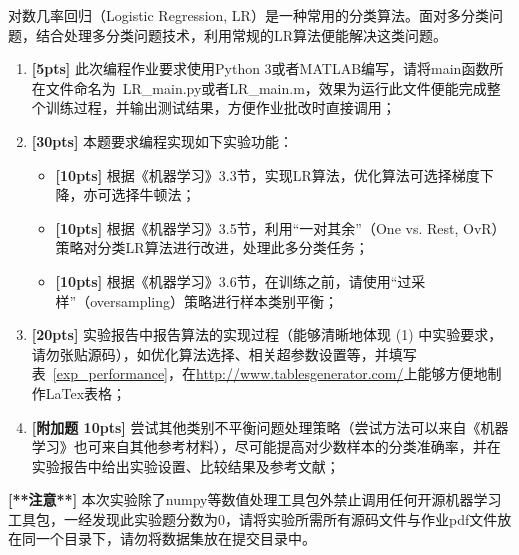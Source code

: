 \documentclass[a4paper,UTF8]{article}
\numberwithin{equation}{section}
\begin{document}
对数几率回归（Logistic Regression, LR）是一种常用的分类算法。面对多分类问题，结合处理多分类问题技术，利用常规的LR算法便能解决这类问题。

\begin{enumerate}[(1)]
    \item \textbf{[5pts]} 此次编程作业要求使用Python 3或者MATLAB编写，请将main函数所在文件命名为~LR\_main.py或者LR\_main.m，效果为运行此文件便能完成整个训练过程，并输出测试结果，方便作业批改时直接调用；	
	\item \textbf{[30pts]} 本题要求编程实现如下实验功能：
	\begin{itemize}
		\item \textbf{[10pts]} 根据《机器学习》3.3节，实现LR算法，优化算法可选择梯度下降，亦可选择牛顿法；
		\item \textbf{[10pts]} 根据《机器学习》3.5节，利用“一对其余”（One vs. Rest, OvR）策略对分类LR算法进行改进，处理此多分类任务；
		\item \textbf{[10pts]} 根据《机器学习》3.6节，在训练之前，请使用“过采样”（oversampling）策略进行样本类别平衡；
	\end{itemize}
	
	

	\item \textbf{[20pts]} 实验报告中报告算法的实现过程（能够清晰地体现 (1) 中实验要求，请勿张贴源码），如优化算法选择、相关超参数设置等，并填写表~\ref{exp_performance}，在\url{http://www.tablesgenerator.com/}上能够方便地制作LaTex表格；
	
	\item \textbf{[附加题 10pts]} 尝试其他类别不平衡问题处理策略（尝试方法可以来自《机器学习》也可来自其他参考材料），尽可能提高对少数样本的分类准确率，并在实验报告中给出实验设置、比较结果及参考文献；
\end{enumerate}
\noindent \textbf{[**注意**]} 本次实验除了numpy等数值处理工具包外禁止调用任何开源机器学习工具包，一经发现此实验题分数为0，请将实验所需所有源码文件与作业pdf文件放在同一个目录下，请勿将数据集放在提交目录中。
\newpage
{}
\end{document}
